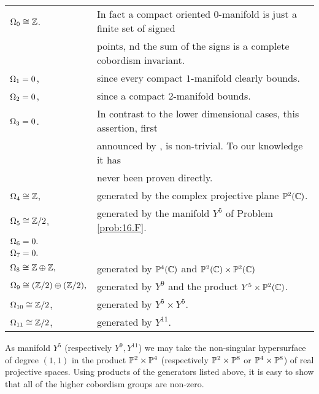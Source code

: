 \documentclass[../main]{subfiles}
\begin{document}
\begin{tabular}{ll}
$\Omega_0 \cong \mathbb{Z}$.     & In fact a compact oriented $0$-manifold is just a finite set of signed \\
& points, nd the sum of the signs is a complete cobordism invariant.\\
$\Omega_1 = 0$,     & since every compact $1$-manifold clearly bounds. \\
$\Omega_2 = 0$,     & since a compact {oriented} $2$-manifold bounds. \\
$\Omega_3 = 0$.     & In contrast to the lower dimensional cases, this assertion, first\\
&announced by \cite{rokhlin}, is non-trivial. To our knowledge it has\\
&never been proven directly. \\ 
$\Omega_4 \cong \mathbb{Z}$,    & generated by the complex projective plane $\mathbb{P}^2(\mathbb C)$. \\ 
$\Omega_5 \cong \mathbb{Z}/2$,      & generated by the manifold $Y^5$ of Problem \ref{prob:16.F}. \\
$\Omega_6 = 0.$ & \\
$\Omega_7 = 0.$ & \\
$\Omega_8 \cong \mathbb{Z} \oplus \mathbb{Z},$ & generated by $\mathbb{P}^4(\mathbb C)$ and $\mathbb{P}^2(\mathbb C)\times\mathbb{P}^2(\mathbb C)$ \\ 
$\Omega_9 \cong (\mathbb{Z}/2) \oplus (\mathbb{Z}/2),$ & generated by $Y^9$ and the product $Y^5 \times \mathbb{P}^2(\mathbb C)$. \\ 
$\Omega_{10} \cong \mathbb{Z}/2$, & generated by $Y^5 \times Y^5$. \\
$\Omega_{11} \cong \mathbb{Z}/2$, & generated by $Y^{11}$.
\end{tabular}

As manifold $Y^5$ (respectively $Y^9, Y^{11}$) we may take the non-singular hypersurface of degree $(1,1)$ in the product $\mathbb{P}^2 \times \mathbb{P}^4$ (respectively $\mathbb{P}^2 \times \mathbb{P}^8$ or $\mathbb{P}^4 \times \mathbb{P}^8$) of real projective spaces. Using products of the generators listed above, it is easy to show that all of the higher cobordism groups are non-zero.
\end{document}
